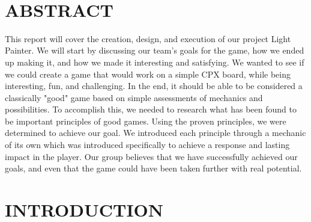 \documentclass[12pt]{article}
\begin{document}
\begin{titlepage}
\begin{minipage}{0.8\textwidth}
\begin{flushleft}
		\end{flushleft}
	\end{minipage}\\[2 cm]
	
	\vfill
	
\end{titlepage}

\tableofcontents
\pagebreak

\section{ABSTRACT}

This report will cover the creation, design, and execution of our project Light Painter. We will start by discussing our team's goals for the game, how we ended up making it, and how we made it interesting and satisfying. We wanted to see if we could create a game that would work on a simple CPX board, while being interesting, fun, and challenging. In the end, it should be able to be considered a classically "good" game based on simple assessments of mechanics and possibilities. To accomplish this, we needed to research what has been found to be important principles of good games. Using the proven principles, we were determined to achieve our goal. We introduced each principle through a mechanic of its own which was introduced specifically to achieve a response and lasting impact in the player. Our group believes that we have successfully achieved our goals, and even that the game could have been taken further with real potential.

\section{INTRODUCTION}
\end{document}
